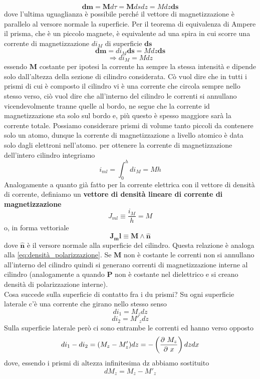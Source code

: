 \documentclass[
10pt, %
a4paper, %
oneside, %
headinclude,footinclude, %
BCOR5mm, %
]{scrartcl}
\begin{document}
\[\mathbf{dm} = \mathbf{M}d\tau = \mathbf{M} ds dz = M dz \mathbf{ds}\]  
dove l'ultima uguaglianza è possibile perché il vettore di magnetizzazione è parallelo al versore normale la superficie. Per il teorema di equivalenza di Ampere il prisma, che è un piccolo magnete, è equivalente ad una spira in cui scorre una corrente di magnetizzazione \(di_M\) di superficie \(\mathbf{ds}\)
\[\mathbf{dm} = di_M \mathbf{ds} = M dz \mathbf{ds}\]
\[\Rightarrow d i_M = M dz\]
essendo \(\mathbf{M}\) costante per ipotesi la corrente ha sempre la stessa intensità e dipende solo dall'altezza della sezione di cilindro considerata. Cò vuol dire che in tutti i prismi di cui è composto il cilindro vi è una corrente che circola sempre nello stesso verso, ciò vuol dire che all'interno del cilindro le correnti si annullano vicendevolmente tranne quelle al bordo, ne segue che la corrente id magnetizzazione sta solo sul bordo e, più questo è spesso maggiore sarà la corrente totale. Possiamo considerare prismi di volume tanto piccoli da contenere solo un atomo, dunque la corrente di magnetizzazione a livello atomico è data solo dagli elettroni nell'atomo. per ottenere la corrente di magnetizzazione dell'intero cilindro integriamo
\[i_{ml} = \int_{0}^{h}di_M=Mh\]
Analogamente a quanto già fatto per la corrente elettrica con il vettore di densità di corrente, definiamo un \textbf{vettore di densità lineare di corrente di magnetizzazione}
\[J_{ml} \equiv \frac{i_M}{h}= M\]
o, in forma vettoriale
\[\mathbf{J_ml} \equiv \mathbf{M}\wedge \mathbf{\hat{n}}\]
dove \(\mathbf{\hat{n}}\) è il versore normale alla superficie del cilindro. Questa relazione è analoga alla \ref{eq:densità_polarizzazione}. Se \(\mathbf{M}\) non è costante le correnti non si annullano all'interno del cilindro quindi si generano correnti di magnetizzazione interne al cilindro (analogamente a quando \(\mathbf{P}\) non è costante nel dielettrico e si creano densità di polarizzazione interne).\\
Cosa succede sulla superficie di contatto fra i du prismi? Su ogni superficie laterale c'è una corrente che girano nello stesso senso
\[di_1 = M_z dz\]
\[di_2 = M'_z dz\]
Sulla superficie laterale però ci sono entrambe le correnti ed hanno verso opposto
\[di_1 - di_2= (M_z-M'_z)dz = -\left(\frac{\partial\  M_z}{\partial\  x}\right)dzdx \]
dove, essendo i prismi di altezza infinitesima dz abbiamo sostituito
\[dM_z = M_z - M'_z\]
\end{document}
